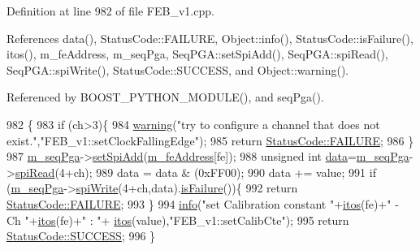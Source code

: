 Definition at line 982 of file F\+E\+B\+\_\+v1.\+cpp.



References data(), Status\+Code\+::\+F\+A\+I\+L\+U\+RE, Object\+::info(), Status\+Code\+::is\+Failure(), itos(), m\+\_\+fe\+Address, m\+\_\+seq\+Pga, Seq\+P\+G\+A\+::set\+Spi\+Add(), Seq\+P\+G\+A\+::spi\+Read(), Seq\+P\+G\+A\+::spi\+Write(), Status\+Code\+::\+S\+U\+C\+C\+E\+SS, and Object\+::warning().



Referenced by B\+O\+O\+S\+T\+\_\+\+P\+Y\+T\+H\+O\+N\+\_\+\+M\+O\+D\+U\+L\+E(), and seq\+Pga().


\begin{DoxyCode}
982                                                          \{
983   \textcolor{keywordflow}{if} (ch>3)\{
984     \hyperlink{classObject_a65cd4fda577711660821fd2cd5a3b4c9}{warning}(\textcolor{stringliteral}{"try to configure a channel that does not exist."},\textcolor{stringliteral}{"FEB\_v1::setClockFallingEdge"});
985     \textcolor{keywordflow}{return} \hyperlink{classStatusCode_a6f565cbeadc76d14c72f047e5e85eb4ba3da73d4c469762eb9d3c960368252b26}{StatusCode::FAILURE};
986   \}
987   \hyperlink{classFEB__v1_a6c7804ac86796f233a8393043adf2e77}{m\_seqPga}->\hyperlink{classSeqPGA_ac998ce3a6d9b5f2e88cc8393f8c1df53}{setSpiAdd}(\hyperlink{classFEB__v1_a4e1945c2d5b434125f375e9d0fc6d99f}{m\_feAddress}[fe]);
988   \textcolor{keywordtype}{unsigned} \textcolor{keywordtype}{int} \hyperlink{classFEB__v1_a6bca4320bd3bbbc32efc81097f33421a}{data}=\hyperlink{classFEB__v1_a6c7804ac86796f233a8393043adf2e77}{m\_seqPga}->\hyperlink{classSeqPGA_ab3d0e5e5d4014bc7a92588a76b8713d4}{spiRead}(4+ch);
989   data = data & (0xFF00);
990   data += value;
991   \textcolor{keywordflow}{if} (\hyperlink{classFEB__v1_a6c7804ac86796f233a8393043adf2e77}{m\_seqPga}->\hyperlink{classSeqPGA_ad4421841ce4ce8b88ad13f63216f0743}{spiWrite}(4+ch,data).\hyperlink{classStatusCode_a5dd22dc6eb2c52fc4cabc58f6dea2eb7}{isFailure}())\{
992     \textcolor{keywordflow}{return} \hyperlink{classStatusCode_a6f565cbeadc76d14c72f047e5e85eb4ba3da73d4c469762eb9d3c960368252b26}{StatusCode::FAILURE};
993   \}
994   \hyperlink{classObject_a644fd329ea4cb85f54fa6846484b84a8}{info}(\textcolor{stringliteral}{"set Calibration constant "}+\hyperlink{Tools_8h_af330027dbdafb9a30768b3613c553e60}{itos}(fe)+\textcolor{stringliteral}{" - Ch "}+\hyperlink{Tools_8h_af330027dbdafb9a30768b3613c553e60}{itos}(fe)+\textcolor{stringliteral}{" : "}+
      \hyperlink{Tools_8h_af330027dbdafb9a30768b3613c553e60}{itos}(value),\textcolor{stringliteral}{"FEB\_v1::setCalibCte"});
995   \textcolor{keywordflow}{return} \hyperlink{classStatusCode_a6f565cbeadc76d14c72f047e5e85eb4badd0da38d3ba0d922efd1f4619bc37ad8}{StatusCode::SUCCESS};
996 \}
\end{DoxyCode}
\mbox{\label{classFEB__v1_a9ccd318b9a80b1cbd554ec6fe461cd82}} 
